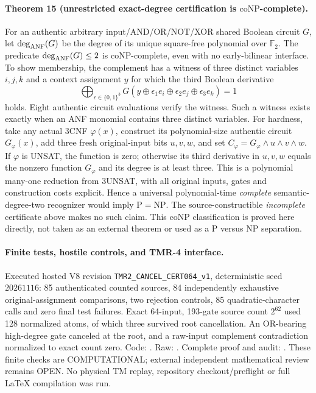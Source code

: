 \documentclass[11pt]{article}
\begin{document}
\paragraph{Theorem 15 (unrestricted exact-degree certification is
\(\mathrm{coNP}\)-complete).}
For an authentic arbitrary input/AND/OR/NOT/XOR shared Boolean circuit
\(G\), let \(\deg_{\rm ANF}(G)\) be the degree of its unique square-free
polynomial over \(\mathbb F_2\).  The predicate
\(\deg_{\rm ANF}(G)\le2\) is \(\mathrm{coNP}\)-complete,
even with no early-bilinear interface.  To show membership, the
complement has a witness of three distinct variables \(i,j,k\)
and a context assignment \(y\) for which the third Boolean derivative
\[
\bigoplus_{\epsilon\in\{0,1\}^{3}}
 G(y\oplus\epsilon_1e_i\oplus
   \epsilon_2e_j\oplus\epsilon_3e_k)=1
\]
holds.  Eight authentic circuit evaluations verify the witness.
Such a witness exists exactly when an ANF monomial contains three
distinct variables.  For hardness, take any actual 3CNF \(\varphi(x)\),
construct its polynomial-size authentic circuit \(G_\varphi(x)\),
add three fresh original-input bits \(u,v,w\), and set
\(C_\varphi=G_\varphi\land u\land v\land w\).
If \(\varphi\) is UNSAT, the function is zero; otherwise its third
derivative in \(u,v,w\) equals the nonzero function \(G_\varphi\)
and its degree is at least three.  This is a polynomial many-one
reduction from 3UNSAT, with all original inputs, gates and construction
costs explicit.  Hence a universal polynomial-time \emph{complete}
semantic-degree-two recognizer would imply
\(\mathrm P=\mathrm{NP}\).
The source-constructible \emph{incomplete} certificate above makes
no such claim.  This coNP classification is proved here directly,
not taken as an external theorem or used as a P versus NP separation.

\paragraph{Finite tests, hostile controls, and TMR-4 interface.}
Executed hosted V8 revision \texttt{TMR2\_CANCEL\_CERT064\_v1},
deterministic seed \(20261116\): 85 authenticated counted sources,
84 independently exhaustive original-assignment comparisons,
two rejection controls, 85 quadratic-character calls and zero
final test failures.  Exact 64-input, 193-gate source count
\(2^{62}\) used 128 normalized atoms, of which three survived
root cancellation.  An OR-bearing high-degree gate canceled at
the root, and a raw-input complement contradiction normalized
to exact count zero.
Code: .
Raw: .
Complete proof and audit:
.
These finite checks are COMPUTATIONAL; external independent
mathematical review remains OPEN.  No physical TM replay,
repository checkout/preflight or full \LaTeX{} compilation was run.
\end{document}
